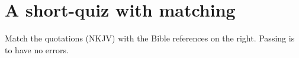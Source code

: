 \documentclass[11pt]{article}
\begin{document}
\section*{A short-quiz with matching}

\begin{shortquiz}
Match the quotations (\textsf{NKJV)} with the Bible references on the right.
Passing is to have no errors.

\noindent
\begin{minipage}[t]{.75\linewidth}
\begin{questions}[labelsep={3bp}]
\begin{BblPsg}
  \item{}
  \item{}
  \item{}
\end{BblPsg}
\end{questions}
\hfill\sqClearButton\olBdry\sqTallyTotal
\end{minipage}\hfill
\begin{minipage}[t]{.25\linewidth-10pt}
\begin{questions}[itemsep=0pt]
\begin{BblVrs}
  \item{}
  \item{}
  \item{}
  \item{}
  \item{}
  \item{}
\end{BblVrs}
\end{questions}
\end{minipage}
\end{shortquiz}
\end{document}
